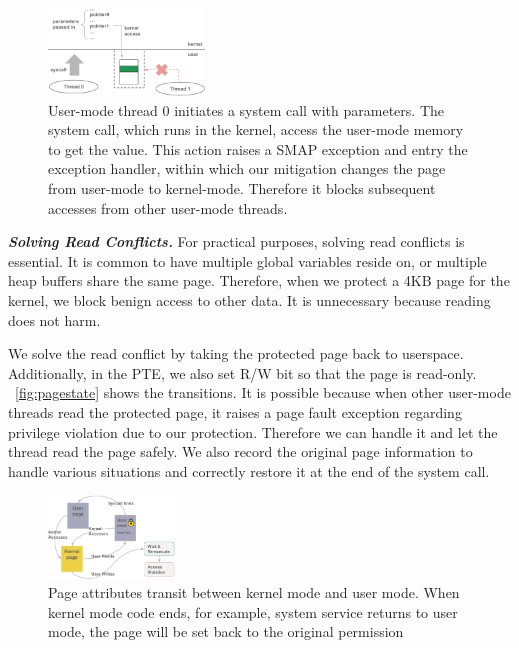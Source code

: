 \begin{figure}[th]
  \includegraphics[width=0.37\textwidth]{figures/denyuserwrite}
  \centering
  \caption{User-mode thread 0 initiates a system call with parameters. The system call, which runs in the kernel, access the user-mode memory to get the value. This action raises a SMAP exception and entry the exception handler, within which our mitigation changes the page from user-mode to kernel-mode. Therefore it blocks subsequent accesses from other user-mode threads.}
  \label{fig:denyuserwrite}
\end{figure}




\textbf{\textit{Solving Read Conflicts.}} For practical purposes, solving read conflicts is essential. It is common to have multiple global variables reside on, or multiple heap buffers share the same page. Therefore, when we protect a 4KB page for the kernel, we block benign access to other data.  It is unnecessary because reading does not harm.  

We solve the read conflict by taking the protected page back to userspace. Additionally, in the PTE, we also set R/W bit so that the page is read-only. ~\autoref{fig:pagestate} shows the transitions. It is possible because when other user-mode threads read the protected page, it raises a page fault exception regarding privilege violation due to our protection. Therefore we can handle it and let the thread read the page safely. We also record the original page information to handle various situations and correctly restore it at the end of the system call. 

\begin{figure}[th]
  \includegraphics[width=0.30\textwidth]{figures/pagestate}
  \centering
  \caption{Page attributes transit between kernel mode and user mode. When kernel mode code ends, for example, system service returns to user mode, the page will be set back to the original permission}
  \label{fig:pagestate}
\end{figure}




